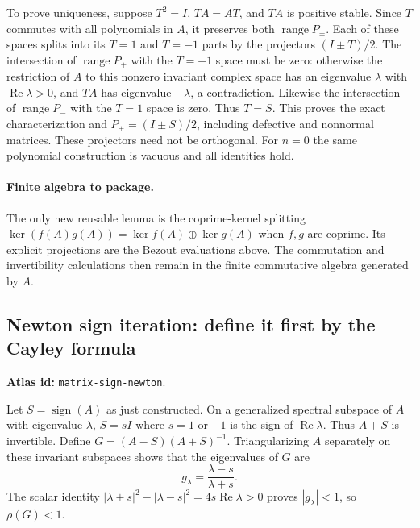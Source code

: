 \documentclass[11pt,a4paper]{article}
\DeclareRobustCommand{\code}[1]{{\footnotesize\urlstyle{tt}\nolinkurl{#1}}}
\begin{document}
To prove uniqueness, suppose $T^2=I$, $TA=AT$, and $TA$ is positive
stable. Since $T$ commutes with all polynomials in $A$, it preserves
both $\operatorname{range}P_\pm$. Each of these spaces splits into its
$T=1$ and $T=-1$ parts by the projectors $(I\pm T)/2$.
The intersection of $\operatorname{range}P_+$ with the $T=-1$ space
must be zero: otherwise the restriction of $A$ to this nonzero invariant
complex space has an eigenvalue $\lambda$ with $\operatorname{Re}\lambda>0$,
and $TA$ has eigenvalue $-\lambda$, a contradiction. Likewise the
intersection of $\operatorname{range}P_-$ with the $T=1$ space is zero.
Thus $T=S$. This proves the exact characterization and
$P_\pm=(I\pm S)/2$, including defective and nonnormal matrices.
These projectors need not be orthogonal. For $n=0$ the same polynomial
construction is vacuous and all identities hold.

\paragraph{Finite algebra to package.}
The only new reusable lemma is the coprime-kernel splitting
$\ker(f(A)g(A))=\ker f(A)\oplus\ker g(A)$ when $f,g$ are coprime.
Its explicit projections are the Bezout evaluations above. The
commutation and invertibility calculations then remain in the finite
commutative algebra generated by $A$.

\subsection{Newton sign iteration: define it first by the Cayley formula}
\label{sec:eq-sign-newton}
\textbf{Atlas id:} \code{matrix-sign-newton}.

Let $S=\operatorname{sign}(A)$ as just constructed. On a generalized
spectral subspace of $A$ with eigenvalue $\lambda$, $S=sI$ where
$s=1$ or $-1$ is the sign of $\operatorname{Re}\lambda$.
Thus $A+S$ is invertible. Define
$G=(A-S)(A+S)^{-1}$. Triangularizing $A$ separately on these invariant
subspaces shows that the eigenvalues of $G$ are
\[
 g_\lambda=\frac{\lambda-s}{\lambda+s}.
\]
The scalar identity
$|\lambda+s|^2-|\lambda-s|^2=4s\operatorname{Re}\lambda>0$
proves $|g_\lambda|<1$, so $\rho(G)<1$.
\end{document}
